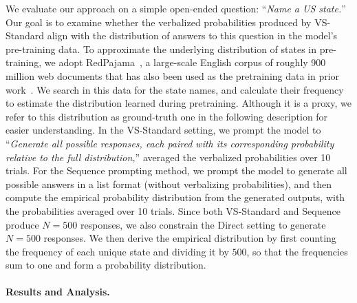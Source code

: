 We evaluate our approach on a simple open-ended question: ``\textit{Name a US state.}'' Our goal is to examine whether the verbalized probabilities produced by VS-Standard align with the distribution of answers to this question in the model's pre-training data. To approximate the underlying distribution of states in pre-training, we adopt RedPajama~\citep{together2023redpajama}, a large-scale English corpus of roughly 900 million web documents that has also been used as the pretraining data in prior work~\citep{lu2025aihumanityssalieriquantifying}. We search in this data for the state names, and calculate their frequency to estimate the distribution learned during pretraining. Although it is a proxy, we refer to this distribution as ground-truth one in the following description for easier understanding.  
In the VS-Standard setting, we prompt the model to ``\textit{Generate all possible responses, each paired with its corresponding probability relative to the full distribution,}'' averaged the verbalized probabilities over 10 trials. 
For the Sequence prompting method, we prompt the model to generate all possible answers in a list format (without verbalizing probabilities), and then compute the empirical probability distribution from the generated outputs, with the probabilities averaged over 10 trials. 
Since both VS-Standard and Sequence produce $N=500$ responses, we also constrain the Direct setting to generate $N=500$ responses. We then derive the empirical distribution by first counting the frequency of each unique state and dividing it by $500$, so that the frequencies sum to one and form a probability distribution.


\paragraph{Results and Analysis.}


